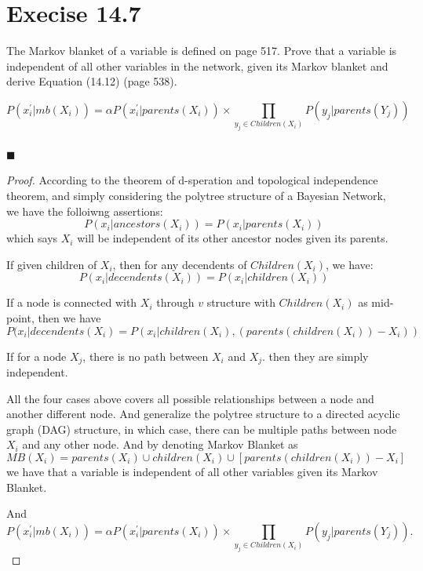 \documentclass{article}
\newcommand{\solution}[1]{~\\ $\blacksquare$ \sffamily\upshape\selectfont #1
\normalfont ~\\~ }
\begin{document}
\section{Execise 14.7}
The Markov blanket of a variable is defined on page 517. Prove that a
variable is independent of all other variables in the network, given
its Markov blanket and derive Equation (14.12) (page 538).

\[ P(x_i^{\prime}|mb(X_i))=\alpha P(x_i^{\prime}|parents(X_i))\times
\prod_{y_j\in Children(X_i)}P(y_j|parents(Y_j)) \]
\solution{
\begin{proof}
  According to the theorem of d-speration and topological independence
  theorem, and simply considering the polytree structure of a Bayesian
  Network, we have the folloiwng assertions: \\
  \[ P(x_i|ancestors(X_i)) = P(x_i|parents(X_i)) \] which says $X_i$
  will be independent of its other ancestor nodes given its parents. 

  If given children of $X_i$, then for any decendents of
  $Children(X_i)$, we have:
  \[ P(x_i|decendents(X_i)) = P(x_i|children(X_i)) \] 
  
  If a node is connected with $X_i$ through $v$ structure with
  $Children(X_i)$ as mid-point, then we have 
  \[ P(x_i|decendents(X_i) =
  P(x_i|children(X_i),(parents(children(X_i))-X_i)) \]

  If for a node $X_j$, there is no path between $X_i$ and $X_j$. then
  they are simply independent. 

  All the four cases above covers all possible relationships between a
  node and another different node. And generalize the polytree
  structure to a directed acyclic graph (DAG) structure, in which
  case, there can be multiple paths between node $X_i$ and any other
  node. And by denoting Markov Blanket as 
  \[ MB(X_i)=parents(X_i)\cup children(X_i) \cup [parents(children(X_i))-X_i] \]
  we have that a variable is independent of all other variables given
  its Markov Blanket. 

  And \[P(x_i^{\prime}|mb(X_i))=\alpha P(x_i^{\prime}|parents(X_i))\times
  \prod_{y_j\in Children(X_i)}P(y_j|parents(Y_j)). \] 

\end{proof}
}
\end{document}
